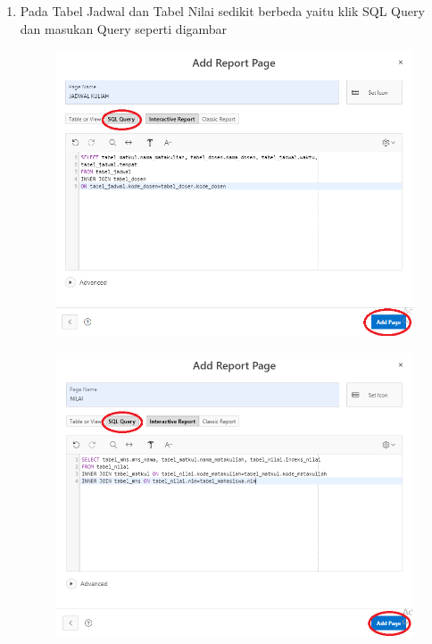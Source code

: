 \begin{enumerate}
	\item Pada Tabel Jadwal dan Tabel Nilai sedikit berbeda yaitu klik  SQL Query dan masukan Query seperti digambar 
	\begin{figure} [!htbp]
	\includegraphics[scale=0.2]{Apex/27.png}
	\centering
	\end{figure}
	
	\begin{figure} [!htbp]
	\includegraphics[scale=0.2]{Apex/28.png}
	\centering
	\end{figure}
	

\end{enumerate}
